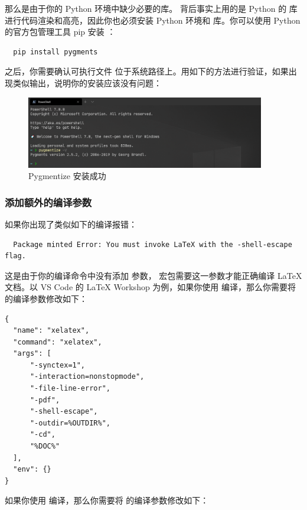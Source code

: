 那么是由于你的 Python 环境中缺少必要的库。 背后事实上用的是 Python 的  库进行代码渲染和高亮，因此你也必须安装 Python 环境和  库。你可以使用 Python 的官方包管理工具 pip 安装 ：

\begin{verbatim}
  pip install pygments
\end{verbatim}

之后，你需要确认可执行文件  位于系统路径上。用如下的方法进行验证，如果出现类似输出，说明你的安装应该没有问题：

\begin{figure}[H]
  \flushright
  \includegraphics[width=0.93\textwidth]{images/pygmentize_test.png}
  \caption{Pygmentize 安装成功}
  \label{pygmentize_test}
\end{figure}

\subsubsection{添加额外的编译参数}

如果你出现了类似如下的编译报错：

\begin{verbatim}
  Package minted Error: You must invoke LaTeX with the -shell-escape flag.
\end{verbatim}

这是由于你的编译命令中没有添加  参数， 宏包需要这一参数才能正确编译 LaTeX 文档。以 VS Code 的 LaTeX Workshop 为例，如果你使用  编译，那么你需要将  的编译参数修改如下：

\begin{verbatim}
{
  "name": "xelatex",
  "command": "xelatex",
  "args": [
      "-synctex=1",
      "-interaction=nonstopmode",
      "-file-line-error",
      "-pdf",
      "-shell-escape",
      "-outdir=%OUTDIR%",
      "-cd",
      "%DOC%"
  ],
  "env": {}
}
\end{verbatim}

如果你使用  编译，那么你需要将  的编译参数修改如下：

